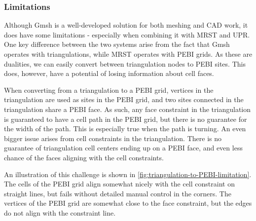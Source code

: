 \subsubsection{Limitations}
Although Gmsh is a well-developed solution for both meshing and CAD work, it does have some limitations - especially when combining it with MRST and UPR. One key difference between the two systems arise from the fact that Gmsh operates with triangulations, while MRST operates with PEBI grids. As these are dualities, we can easily convert between triangulation nodes to PEBI sites. This does, however, have a potential of losing information about cell faces.

When converting from a triangulation to a PEBI grid, vertices in the triangulation are used as sites in the PEBI grid, and two sites connected in the triangulation share a PEBI face. As such, any face constraint in the triangulation is guaranteed to have a cell path in the PEBI grid, but there is no guarantee for the width of the path. This is especially true when the path is turning. An even bigger issue arises from cell constraints in the triangulation. There is no guarantee of triangulation cell centers ending up on a PEBI face, and even less chance of the faces aligning with the cell constraints.

An illustration of this challenge is shown in \autoref{fig:triangulation-to-PEBI-limitation}. The cells of the PEBI grid align somewhat nicely with the cell constraint on straight lines, but fails without detailed manual control in the corners. The vertices of the PEBI grid are somewhat close to the face constraint, but the edges do not align with the constraint line.

